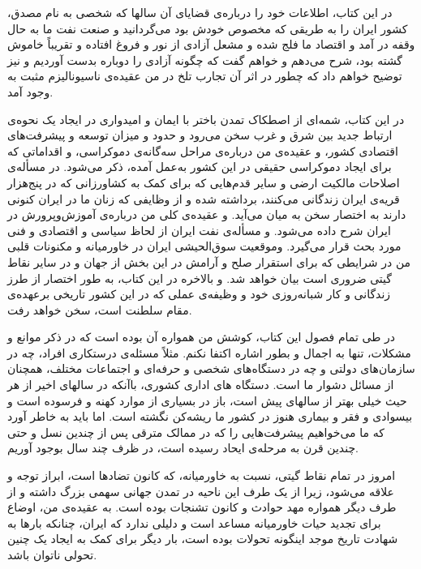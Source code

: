 \par
	در این کتاب، اطلاعات خود را درباره‌ی قضایای آن سالها که شخصی به نام \gls{مصدق}، کشور ایران را به طریقی که مخصوص خودش بود می‌گردانید و صنعت نفت ما به حال وقفه در آمد و اقتصاد ما فلج شده و مشعل آزادی از نور و فروغ افتاده و تقریباً خاموش گشته بود، شرح می‌دهم و خواهم گفت که چگونه آزادی را دوباره بدست آوردیم و نیز توضیح خواهم داد که چطور در اثر آن تجارب تلخ در من عقیده‌ی ناسیونالیزم مثبت به وجود آمد.  
\par
	در این کتاب، شمه‌ای از اصطکاک تمدن باختر با ایمان و امیدواری در ایجاد یک نحوه‌ی ارتباط جدید بین شرق و غرب سخن می‌رود و حدود و میزان توسعه و پیشرفت‌های اقتصادی کشور، و عقیده‌ی من درباره‌ی مراحل سه‌گانه‌ی دموکراسی، و اقداماتی که برای ایجاد دموکراسی حقیقی در این کشور به‌عمل آمده، ذکر می‌شود. در مسأله‌ی اصلاحات مالکیت ارضی و سایر قدم‌هایی که برای کمک به کشاورزانی که در پنج‌هزار قریه‌ی ایران زندگانی می‌کنند، برداشته شده و از وظایفی که زنان ما در ایران کنونی دارند به اختصار سخن به میان می‌آید. و عقیده‌ی کلی من درباره‌ی آموزش‌و‌پرورش در ایران شرح داده می‌شود. 
	و مسأله‌ی نفت ایران از لحاظ سیاسی و اقتصادی و فنی مورد بحث قرار می‌گیرد. وموقعیت سوق‌الحیشی ایران در خاورمیانه و مکنونات قلبی من در شرایطی که برای استقرار صلح و آرامش در این بخش از جهان و در سایر نقاط گیتی ضروری است بیان خواهد شد. و بالاخره در این کتاب، به طور اختصار از طرز زندگانی و کار شبانه‌روزی خود و وظیفه‌ی عملی که در این کشور تاریخی برعهده‌ی مقام سلطنت است، سخن خواهد رفت.   
\par
در طی تمام فصول این کتاب، کوشش من همواره آن بوده است که در ذکر موانع و مشکلات، تنها به اجمال و بطور اشاره اکتفا نکنم. مثلاً مسئله‌ی درستکاری افراد، چه در سازمان‌های دولتی و چه در دستگاه‌های شخصی و حرفه‌ای و اجتماعات مختلف، همچنان از مسائل دشوار ما است. 
دستگاه های اداری کشوری، باآنکه در سالهای اخیر از هر حیث خیلی بهتر از سالهای پیش است، باز در بسیاری از موارد کهنه و فرسوده است و بیسوادی و فقر و بیماری هنوز در کشور ما ریشه‌کن نگشته است. اما باید به خاطر آورد که ما می‌خواهیم پیشرفت‌هایی را که در ممالک مترقی پس از چندین نسل و حتی چندین قرن به مرحله‌ی ایحاد رسیده است، در ظرف چند سال بوجود آوریم.   
\par
	امروز در تمام نقاط گیتی، نسبت به خاورمیانه، که کانون تضادها است، ابراز توجه و علاقه می‌شود، زیرا از یک طرف این ناحیه در تمدن جهانی سهمی بزرگ داشته و از طرف دیگر همواره مهد حوادث و کانون تشنجات بوده است. به عقیده‌ی من، اوضاع برای تجدید حیات خاورمیانه مساعد است و دلیلی ندارد که ایران، چنانکه بارها به شهادت تاریخ موجد اینگونه تحولات بوده است، بار دیگر برای کمک به ایجاد یک چنین تحولی ناتوان باشد.   